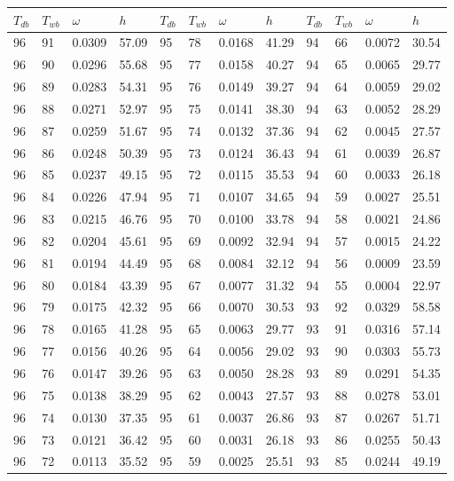 \begin{tabular}{llll|llll|llll}
 \toprule 
\(T_{db}\) & \(T_{wb}\) & \(\omega\) & \(h\) & \(T_{db}\) & \(T_{wb}\) & \(\omega\) & \(h\) & \(T_{db}\) & \(T_{wb}\) & \(\omega\) & \(h\)  \\ \midrule 
96 & 91 & 0.0309 & 57.09 & 95 & 78 & 0.0168 & 41.29 & 94 & 66 & 0.0072 & 30.54\\
96 & 90 & 0.0296 & 55.68 & 95 & 77 & 0.0158 & 40.27 & 94 & 65 & 0.0065 & 29.77\\
96 & 89 & 0.0283 & 54.31 & 95 & 76 & 0.0149 & 39.27 & 94 & 64 & 0.0059 & 29.02\\
96 & 88 & 0.0271 & 52.97 & 95 & 75 & 0.0141 & 38.30 & 94 & 63 & 0.0052 & 28.29\\
96 & 87 & 0.0259 & 51.67 & 95 & 74 & 0.0132 & 37.36 & 94 & 62 & 0.0045 & 27.57\\
96 & 86 & 0.0248 & 50.39 & 95 & 73 & 0.0124 & 36.43 & 94 & 61 & 0.0039 & 26.87\\
96 & 85 & 0.0237 & 49.15 & 95 & 72 & 0.0115 & 35.53 & 94 & 60 & 0.0033 & 26.18\\
96 & 84 & 0.0226 & 47.94 & 95 & 71 & 0.0107 & 34.65 & 94 & 59 & 0.0027 & 25.51\\
96 & 83 & 0.0215 & 46.76 & 95 & 70 & 0.0100 & 33.78 & 94 & 58 & 0.0021 & 24.86\\
96 & 82 & 0.0204 & 45.61 & 95 & 69 & 0.0092 & 32.94 & 94 & 57 & 0.0015 & 24.22\\
96 & 81 & 0.0194 & 44.49 & 95 & 68 & 0.0084 & 32.12 & 94 & 56 & 0.0009 & 23.59\\
96 & 80 & 0.0184 & 43.39 & 95 & 67 & 0.0077 & 31.32 & 94 & 55 & 0.0004 & 22.97\\
96 & 79 & 0.0175 & 42.32 & 95 & 66 & 0.0070 & 30.53 & 93 & 92 & 0.0329 & 58.58\\
96 & 78 & 0.0165 & 41.28 & 95 & 65 & 0.0063 & 29.77 & 93 & 91 & 0.0316 & 57.14\\
96 & 77 & 0.0156 & 40.26 & 95 & 64 & 0.0056 & 29.02 & 93 & 90 & 0.0303 & 55.73\\
96 & 76 & 0.0147 & 39.26 & 95 & 63 & 0.0050 & 28.28 & 93 & 89 & 0.0291 & 54.35\\
96 & 75 & 0.0138 & 38.29 & 95 & 62 & 0.0043 & 27.57 & 93 & 88 & 0.0278 & 53.01\\
96 & 74 & 0.0130 & 37.35 & 95 & 61 & 0.0037 & 26.86 & 93 & 87 & 0.0267 & 51.71\\
96 & 73 & 0.0121 & 36.42 & 95 & 60 & 0.0031 & 26.18 & 93 & 86 & 0.0255 & 50.43\\
96 & 72 & 0.0113 & 35.52 & 95 & 59 & 0.0025 & 25.51 & 93 & 85 & 0.0244 & 49.19\\

\end{tabular}

